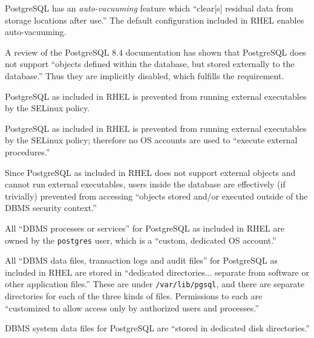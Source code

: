 %
PostgreSQL has an \emph{auto-vacuuming} feature which ``clear[s] residual
data from storage locations after use.'' The default configuration
included in RHEL enables auto-vacuuming.


%
A review of the PostgreSQL 8.4 documentation has shown that PostgreSQL
does not support ``objects defined within the database, but stored
externally to the database.'' Thus they are implicitly disabled, which
fulfills the requirement.

%
PostgreSQL as included in RHEL is prevented from running external
executables by the SELinux policy.

%
PostgreSQL as included in RHEL is prevented from running external
executables by the SELinux policy; therefore no OS accounts are used to
``execute external procedures.''

%
Since PostgreSQL as included in RHEL does not support external objects and
cannot run external executables, users inside the database are effectively
(if trivially) prevented from accessing ``objects stored and/or executed
outside of the DBMS security context.''

%
All ``DBMS processes or services'' for PostgreSQL as included in RHEL are
owned by the \verb!postgres! user, which is a ``custom, dedicated OS
account.''

%
All ``DBMS data files, transaction logs and audit files'' for PostgreSQL
as included in RHEL are stored in ``dedicated directories... separate from
software or other application files.'' These are under
\verb!/var/lib/pgsql!, and there are separate directories for each of the
three kinds of files. Permissions to each are ``customized to allow access only
by authorized users and processes.''

%
DBMS system data files for PostgreSQL are ``stored in dedicated disk
directories.''

